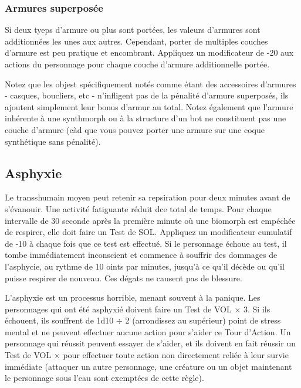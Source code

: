 \subsubsection{Armures superposée} 

Si deux tyeps d'armure ou plus sont portées, les valeurs d'armures sont additionnées les unes aux autres. Cependant, porter de multiples couches d'armure est peu pratique et encombrant. Appliquez un modificateur de -20 aux actions du personnage pour chaque couche d'armure additionnelle portée. 

Notez que les objest spécifiquement notés comme étant des accessoires d'armures - casques, boucliers, etc - n'infligent pas de la pénalité d'armure superposés, ils ajoutent simplement leur bonus d'armur au total. Notez également que l'armure inhérente à une synthmorph ou à la structure d'un bot ne constituent pas une couche d'armure (càd que vous pouvez porter une armure sur une coque synthétique sans pénalité). 



\subsection{Asphyxie} \label{sec:asphyxiation} 

Le transshumain moyen peut retenir sa repsiration pour deux minutes avant de s'évanouir. Une activité fatiguante réduit dce total de temps. Pour chaque intervalle de 30 seconde après la première minute où une biomorph est empéchée de respirer, elle doit faire un Test de SOL. Appliquez un modificateur cumulatif de -10 à chaque fois que ce test est effectué. Si le personnage échoue au test, il tombe immédiatement inconscient et commence à souffrir des dommages de l'asphycie, au rythme de 10 oints par minutes, jusqu'à ce qu'il décède ou qu'il puisse respirer de nouveau. Ces dégats ne causent pas de blessure. 

L'asphyxie est un processus horrible, menant souvent à la panique. Les personnages qui ont été asphyxié doivent faire un Test de VOL $\times$ 3. Si ils échouent, ils souffrent de 1d10 $\div$ 2 (arrondissez au supérieur) point de stress mental et ne peuvent effectuer aucune action pour s'aider ce Tour d'Action. Un personnage qui réussit peuvent essayer de s'aider, et ils doivent en fait réussir un Test de VOL $\times$ pour effectuer toute action non directement reliée à leur survie immédiate (attaquer un autre personnage, une créature ou un objet maintenant le personnage sous l'eau sont exemptées de cette règle). 




